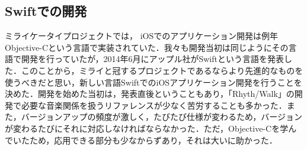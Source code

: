 \subsection{Swiftでの開発}
\par
ミライケータイプロジェクトでは， iOSでのアプリケーション開発は例年Objective-Cという言語で実装されていた．我々も開発当初は同じようにその言語で開発を行っていたが，2014年6月にアップル社がSwiftという言語を発表した．このことから，ミライと冠するプロジェクトであるならより先進的なものを使うべきだと思い，新しい言語SwiftでのiOSアプリケーション開発を行うことを決めた．開発を始めた当初は，発表直後ということもあり，「Rhyth/Walk」の開発で必要な音楽関係を扱うリファレンスが少なく苦労することも多かった．また，バージョンアップの頻度が激しく，たびたび仕様が変わるため，バージョンが変わるたびにそれに対応しなければならなかった．ただ，Objective-Cを学んでいたため，応用できる部分も少なからずあり，それは大いに助かった．
